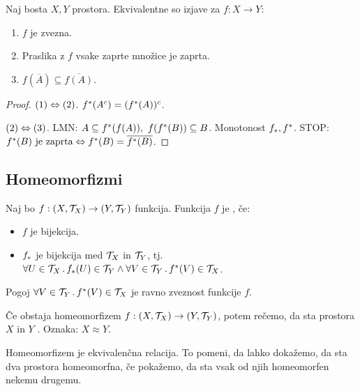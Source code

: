 \begin{trditev}
    Naj bosta $X, Y$ prostora. Ekvivalentne so izjave za $f: X \to Y$:
    \begin{enumerate}
        \item $f$ je zvezna.
        \item Praslika z $f$ vsake zaprte množice je zaprta.
        \item $f(\overline{A}) \subseteq \overline{f(A)}$.
    \end{enumerate}
\end{trditev}

\begin{proof}
    $(1) \Leftrightarrow (2)$. $f^{*}(A^c) = (f^{*}(A))^c$.

    $(2) \Leftrightarrow (3)$. LMN: $A \subseteq f^{*}(f(A)), \ f(f^{*}(B)) \subseteq B$. Monotonost $f_{*}, f^{*}$. STOP:
    $f^{*}(B) \text{ je zaprta} \Leftrightarrow f^{*}(B) = \overline{f^{*}(B)}$.
\end{proof}

\subsection{Homeomorfizmi}
\begin{definicija}
    Naj bo $f: (X, \mathcal{T}_X) \to (Y, \mathcal{T}_Y)$ funkcija. Funkcija $f$ je , če:
    \begin{itemize}
        \item $f$ je bijekcija.
        \item $f_{*}$ je bijekcija med $\mathcal{T}_X$ in $\mathcal{T}_Y$, tj. $\forall U \in \mathcal{T}_X \,.\, f_{*}(U) \in \mathcal{T}_Y \land \forall V \in \mathcal{T}_Y \,.\, f^{*}(V) \in \mathcal{T}_X$.
    \end{itemize}
\end{definicija}

\begin{opomba}
    Pogoj $\forall V \in \mathcal{T}_Y \,.\, f^{*}(V) \in \mathcal{T}_X$ je ravno zveznost funkcije $f$.
\end{opomba}

\begin{definicija}
    Če obstaja homeomorfizem $f: (X, \mathcal{T}_X) \to (Y, \mathcal{T}_Y)$, potem rečemo, da sta prostora $X$ in $Y$ . Oznaka: $X \approx  Y$.
\end{definicija}

\begin{opomba}
    Homeomorfizem je ekvivalenčna relacija. To pomeni, da lahko dokažemo, da sta dva prostora homeomorfna, če pokažemo, da sta vsak od njih homeomorfen nekemu drugemu.
\end{opomba}

